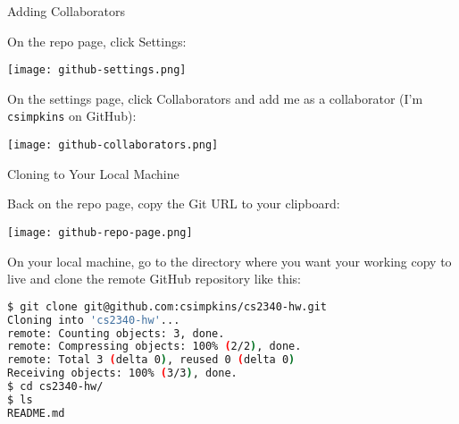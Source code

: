 \documentclass{beamer}
\begin{document}
\begin{frame}[fragile]{Adding Collaborators}


On the repo page, click Settings:
\begin{center}
\texttt{[image: github-settings.png]}
\end{center}


On the settings page, click Collaborators and add me as a collaborator (I'm {\tt csimpkins} on GitHub):
\vspace{-.1in}
\begin{center}
\texttt{[image: github-collaborators.png]}
\end{center}

\end{frame}

\begin{frame}[fragile]{Cloning to Your Local Machine}


Back on the repo page, copy the Git URL to your clipboard:
\begin{center}
\texttt{[image: github-repo-page.png]}
\end{center}
\vspace{-.1in}
On your local machine, go to the directory where you want your working copy to live and clone the remote GitHub repository like this:
\begin{lstlisting}[language=bash]
$ git clone git@github.com:csimpkins/cs2340-hw.git
Cloning into 'cs2340-hw'...
remote: Counting objects: 3, done.
remote: Compressing objects: 100% (2/2), done.
remote: Total 3 (delta 0), reused 0 (delta 0)
Receiving objects: 100% (3/3), done.
$ cd cs2340-hw/
$ ls
README.md
\end{lstlisting}

\end{frame}
\end{document}
